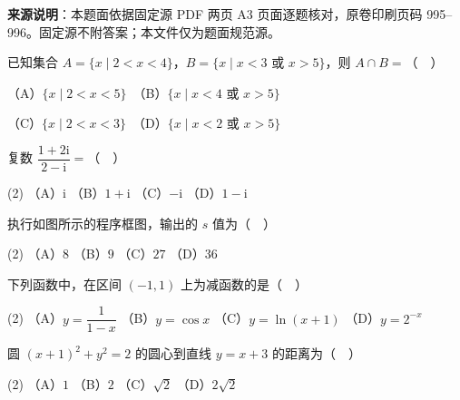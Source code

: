 


\begin{gktip}
\textbf{来源说明}：本题面依据固定源 PDF 两页 A3 页面逐题核对，原卷印刷页码 995–996。固定源不附答案；本文件仅为题面规范源。
\end{gktip}


\begin{question}
已知集合 \(A=\{x\mid 2<x<4\}\)，\(B=\{x\mid x<3\) 或 \(x>5\}\)，则 \(A\cap B=\)（　）

（A）\(\{x\mid 2<x<5\}\)　（B）\(\{x\mid x<4\) 或 \(x>5\}\)

（C）\(\{x\mid 2<x<3\}\)　（D）\(\{x\mid x<2\) 或 \(x>5\}\)

\end{question}
\begin{question}
复数 \(\dfrac{1+2\mathrm{i}}{2-\mathrm{i}}=\)（　）

\begin{gkopts}(2)
\task （A）\(\mathrm{i}\)
\task （B）\(1+\mathrm{i}\)
\task （C）\(-\mathrm{i}\)
\task （D）\(1-\mathrm{i}\)
\end{gkopts}

\Needspace{0.4\textheight}
\end{question}
\begin{question}
执行如图所示的程序框图，输出的 \(s\) 值为（　）
\nopagebreak[4]
\begin{center}\end{center}
\nopagebreak[4]
\begin{gkopts}(2)
\task （A）\(8\)
\task （B）\(9\)
\task （C）\(27\)
\task （D）\(36\)
\end{gkopts}

\end{question}
\begin{question}
下列函数中，在区间 \((-1,1)\) 上为减函数的是（　）

\begin{gkopts}(2)
\task （A）\(y=\dfrac{1}{1-x}\)
\task （B）\(y=\cos x\)
\task （C）\(y=\ln(x+1)\)
\task （D）\(y=2^{-x}\)
\end{gkopts}

\end{question}
\begin{question}
圆 \((x+1)^{2}+y^{2}=2\) 的圆心到直线 \(y=x+3\) 的距离为（　）

\begin{gkopts}(2)
\task （A）\(1\)
\task （B）\(2\)
\task （C）\(\sqrt{2}\)
\task （D）\(2\sqrt{2}\)
\end{gkopts}

\end{question}
